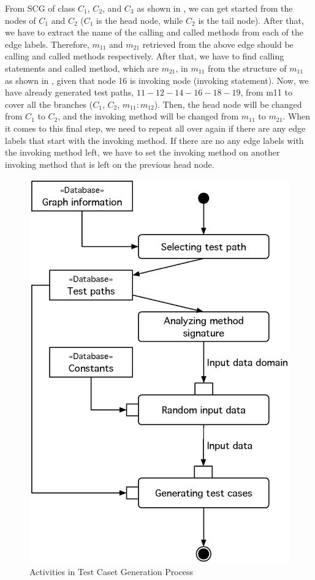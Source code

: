 From SCG of class $C_1$, $C_2$, and $C_3$ as shown in , 
we can get started from the nodes of $C_1$ and $C_2$ ($C_1$ is the head node, 
while $C_2$ is the tail node). After that, we have to extract the name of 
the calling and called methods from each of the edge labels. 
Therefore, $m_{11}$ and $m_{21}$ retrieved from the above edge should be 
calling and called methods respectively. After that, we have to find 
calling statements and called method, which are $m_{21}$, in $m_{11}$ from 
the structure of $m_{11}$ as shown in , given that node 16 is invoking node 
(invoking statement). Now, we have already generated test paths, $11-12-14-16-18-19$, 
from m11 to cover all the branches ($C_1$, $C_2$, $m_{11}:m_{12}$). Then, the head node 
will be changed from $C_1$ to $C_2$, and the invoking method will be changed 
from $m_{11}$ to $m_{21}$. When it comes to this final step, we need to repeat all 
over again if there are any edge labels that start with the invoking method. 
If there are no any edge labels with the invoking method left, we have to set 
the invoking method on another invoking method that is left on 
the previous head node.

\begin{figure}[ht!]
\centering
\includegraphics[width=0.7\linewidth]{figures/Activities}
\caption{Activities in Test Caset Generation Process}
\label{fig:activitiesTC}
\end{figure}

